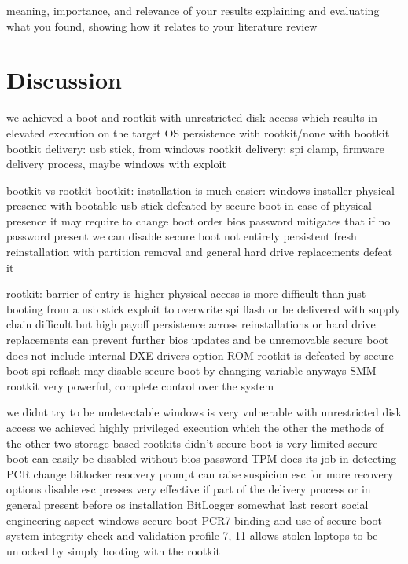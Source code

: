 

meaning, importance, and relevance of your results
explaining and evaluating what you found, showing how it relates to your literature review

\chapter{Discussion}

we achieved a boot and rootkit with unrestricted disk access which results in elevated execution on the target OS
persistence with rootkit/none with bootkit
bootkit delivery:
usb stick, from windows
rootkit delivery:
spi clamp, firmware delivery process, maybe windows with exploit

bootkit vs rootkit
bootkit:
installation is much easier:
windows installer
physical presence with bootable usb stick
defeated by secure boot
in case of physical presence it may require to change boot order
bios password mitigates that
if no password present we can disable secure boot
not entirely persistent
fresh reinstallation with partition removal and general hard drive replacements defeat it

rootkit:
barrier of entry is higher
physical access is more difficult than just booting from a usb stick
exploit to overwrite spi flash or be delivered with supply chain difficult
but high payoff
persistence across reinstallations or hard drive replacements
can prevent further bios updates and be unremovable
secure boot does not include internal DXE drivers
option ROM rootkit is defeated by secure boot
spi reflash may disable secure boot by changing variable anyways
SMM rootkit very powerful, complete control over the system


we didnt try to be undetectable
windows is very vulnerable with unrestricted disk access
we achieved highly privileged execution which the other the methods of the other two storage based rootkits didn't
secure boot is very limited
secure boot can easily be disabled without bios password
TPM does its job in detecting PCR change
bitlocker reocvery prompt can raise suspicion
esc for more recovery options
disable esc presses
very effective if part of the delivery process or in general present before os installation
BitLogger somewhat last resort
social engineering aspect
windows secure boot PCR7 binding and use of secure boot system integrity check and validation profile 7, 11 allows stolen laptops to be unlocked by simply booting with the rootkit

